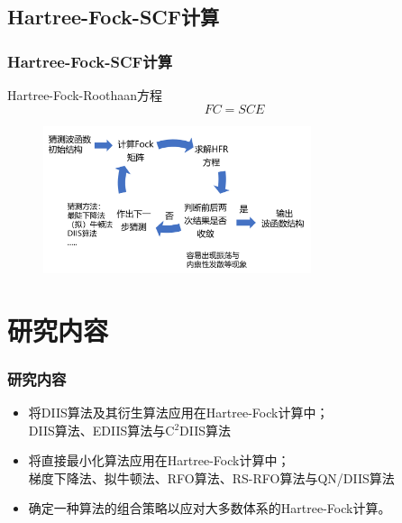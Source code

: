 \documentclass[10pt,aspectratio=43,mathserif,UTF8]{beamer}
\begin{document}
\subsection{Hartree-Fock-SCF计算}
\begin{frame}
\frametitle{Hartree-Fock-SCF计算}
Hartree-Fock-Roothaan方程
\begin{equation}
	FC=SCE
\end{equation}

\begin{figure}[htbp]
	\centering
	\includegraphics[width=0.7\textwidth]{figure/HF/HF_process2.png}
\end{figure}
\end{frame}


\section{研究内容}
\begin{frame}
\frametitle{研究内容}
	\begin{itemize}
		\item 将DIIS算法及其衍生算法应用在Hartree-Fock计算中；\\
		DIIS算法、EDIIS算法与C$^2$DIIS算法
		\item 将直接最小化算法应用在Hartree-Fock计算中；\\
		梯度下降法、拟牛顿法、RFO算法、RS-RFO算法与QN/DIIS算法
		\item 确定一种算法的组合策略以应对大多数体系的Hartree-Fock计算。
	\end{itemize}

\end{frame}


\end{document}
